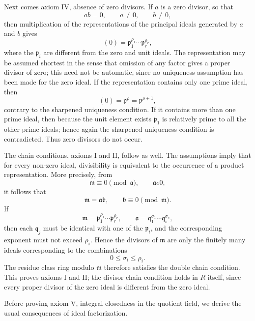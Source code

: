 \documentclass[11pt]{article}
\begin{document}
Next comes axiom IV, absence of zero divisors. If \(a\) is a zero
divisor, so that \[
  ab=0,
  \qquad a\ne0,
  \qquad b\ne0,
\] then multiplication of the representations of the principal ideals
generated by \(a\) and \(b\) gives \[
  (0)=\mathfrak p_1^{\rho_1}\cdots\mathfrak p_r^{\rho_r},
\] where the \(\mathfrak p_i\) are different from the zero and unit
ideals. The representation may be assumed shortest in the sense that
omission of any factor gives a proper divisor of zero; this need not be
automatic, since no uniqueness assumption has been made for the zero
ideal. If the representation contains only one prime ideal, then \[
  (0)=\mathfrak p^{\rho}=\mathfrak p^{\rho+1},
\] contrary to the sharpened uniqueness condition. If it contains more
than one prime ideal, then because the unit element exists
\(\mathfrak p_1\) is relatively prime to all the other prime ideals;
hence again the sharpened uniqueness condition is contradicted. Thus
zero divisors do not occur.

The chain conditions, axioms I and II, follow as well. The assumptions
imply that for every non-zero ideal, divisibility is equivalent to the
occurrence of a product representation. More precisely, from \[
  \mathfrak m\equiv0\pmod{\mathfrak a},
  \qquad \mathfrak a
e0,
\] it follows that \[
  \mathfrak m=\mathfrak a\mathfrak b,
  \qquad \mathfrak b\equiv0\pmod{\mathfrak m}.
\] If \[
  \mathfrak m=\mathfrak p_1^{\rho_1}\cdots\mathfrak p_r^{\rho_r},
  \qquad \mathfrak a=\mathfrak q_1^{\sigma_1}\cdots\mathfrak q_s^{\sigma_s},
\] then each \(\mathfrak q_j\) must be identical with one of the
\(\mathfrak p_i\), and the corresponding exponent must not exceed
\(\rho_i\). Hence the divisors of \(\mathfrak m\) are only the finitely
many ideals corresponding to the combinations \[
  0\le \sigma_i\le \rho_i.
\] The residue class ring modulo \(\mathfrak m\) therefore satisfies the
double chain condition. This proves axioms I and II; the divisor-chain
condition holds in \(R\) itself, since every proper divisor of the zero
ideal is different from the zero ideal.

Before proving axiom V, integral closedness in the quotient field, we
derive the usual consequences of ideal factorization.
\end{document}
